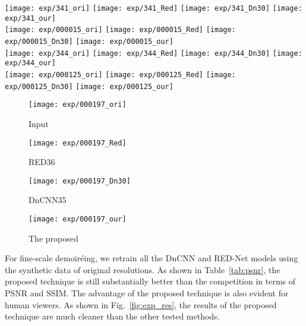 \documentclass[10pt,twocolumn,letterpaper]{article}
\begin{document}
\begin{figure*}
  \centering
  \texttt{[image: exp/341\_ori]}
  \texttt{[image: exp/341\_Red]}
  \texttt{[image: exp/341\_Dn30]}
  \texttt{[image: exp/341\_our]} \\
  \vspace{0.2ex}
  \texttt{[image: exp/000015\_ori]}
  \texttt{[image: exp/000015\_Red]}
  \texttt{[image: exp/000015\_Dn30]}
  \texttt{[image: exp/000015\_our]} \\
  \vspace{0.2ex}
  \texttt{[image: exp/344\_ori]}
  \texttt{[image: exp/344\_Red]}
  \texttt{[image: exp/344\_Dn30]}
  \texttt{[image: exp/344\_our]} \\
  \vspace{0.2ex}
  \texttt{[image: exp/000125\_ori]}
  \texttt{[image: exp/000125\_Red]}
  \texttt{[image: exp/000125\_Dn30]}
  \texttt{[image: exp/000125\_our]} \\
  \vspace{0.2ex}
  \begin{subfigure}{0.23\linewidth}
    \centering
    \texttt{[image: exp/000197\_ori]}
    \caption{Input}
  \end{subfigure}
  \begin{subfigure}{0.23\linewidth}
    \centering
    \texttt{[image: exp/000197\_Red]}
    \caption{RED36}
  \end{subfigure}
  \begin{subfigure}{0.23\linewidth}
    \centering
    \texttt{[image: exp/000197\_Dn30]}
    \caption{DnCNN35}
  \end{subfigure}
  \begin{subfigure}{0.23\linewidth}
    \centering
    \texttt{[image: exp/000197\_our]}
    \caption{The proposed}
  \end{subfigure}
  \caption{Samples of demoir\'eing results by the tested techniques
    using real fine-scale camera-captured screen images.}
  \label{fig:exp_res}
\end{figure*}

For fine-scale demoir\'eing, we retrain all the DnCNN and RED-Net
models using the synthetic data of original resolutions.  As shown in
Table~\ref{tab:psnr}, the proposed technique is still substantially
better than the competition in terms of PSNR and SSIM.  The advantage
of the proposed technique is also evident for human viewers.  As shown
in Fig.~\ref{fig:exp_res}, the results of the proposed technique are
much cleaner than the other tested methods.
\end{document}
